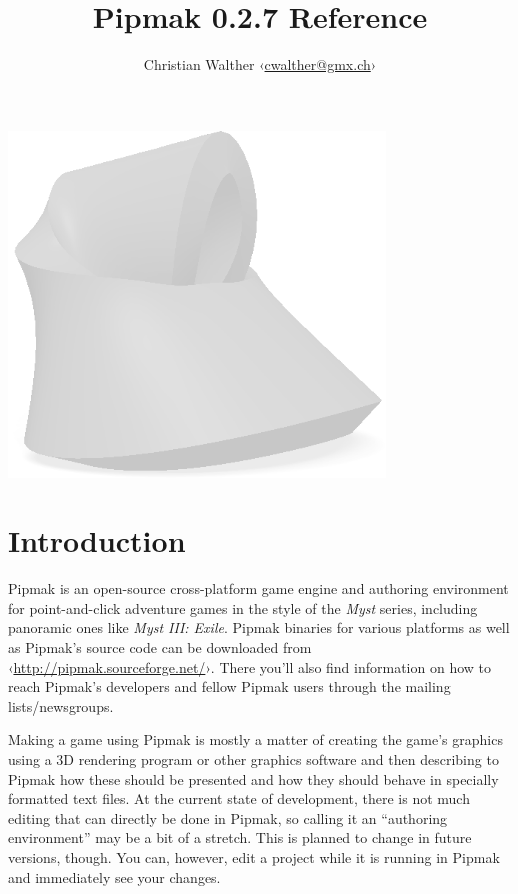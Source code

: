\documentclass[
	a4paper,
	pagesize,
	10pt,
	oneside,
	idxtotoc,
	bibtotoc,
	BCOR10mm,
	DIV10
]{scrartcl} %
\title{Pipmak 0.2.7 Reference}
\author{Christian Walther \textsf{‹\href{mailto:cwalther@gmx.ch}{cwalther@gmx.ch}›}}
\renewcommand{\url}[1]{\textsf{‹\href{#1}{#1}›}}
\begin{document}

\maketitle
\vspace{2cm}
\begin{center}\includegraphics[width=10cm]{figures/pipmak.png}\end{center}
\newpage
\tableofcontents
\newpage

\section{Introduction}
Pipmak is an open-source cross-platform game engine and authoring environment for point-and-click adventure games in the style of the \emph{Myst} series, including panoramic ones like \emph{Myst III: Exile}. Pipmak binaries for various platforms as well as Pipmak's source code can be downloaded from \url{http://pipmak.sourceforge.net/}. There you'll also find information on how to reach Pipmak's developers and fellow Pipmak users through the mailing lists/newsgroups.

Making a game using Pipmak is mostly a matter of creating the game's graphics using a 3D rendering program or other graphics software and then describing to Pipmak how these should be presented and how they should behave in specially formatted text files. At the current state of development, there is not much editing that can directly be done in Pipmak, so calling it an “authoring environment” may be a bit of a stretch. This is planned to change in future versions, though. You can, however, edit a project while it is running in Pipmak and immediately see your changes.
\end{document}
